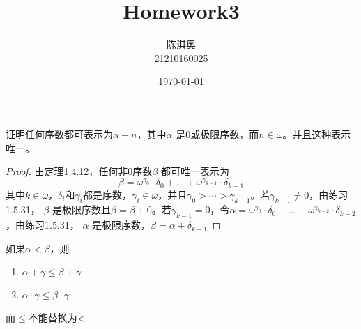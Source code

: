 \documentclass[11pt]{article}
\author{陈淇奥\\21210160025}
\date{\today}
\title{Homework3}
\begin{document}
\maketitle
\begin{exercise}[1.5.26]
证明任何序数都可表示为\(\alpha+n\)，其中\(\alpha\) 是0或极限序数，而\(n\in\omega\)。并且这种表示唯一。
\end{exercise}

\begin{proof}
由定理1.4.12，任何非0序数\(\beta\) 都可唯一表示为
\begin{equation*}
\beta=\omega^{\gamma_0}\cdot\delta_0+\dots+\omega^{\gamma_{k-1}}\cdot\delta_{k-1}
\end{equation*}
其中\(k\in\omega\)，\(\delta_i\)和\(\gamma_i\)都是序数，\(\gamma_i\in\omega\)，并且\(\gamma_0>\cdots>\gamma_{k-1}\)。若\(\gamma_{k-1}\neq 0\)，由练习1.5.31，
\(\beta\) 是极限序数且\(\beta=\beta+0\)。若\(\gamma_{k-1}=0\)，令\(\alpha=\omega^{\gamma_0}\cdot\delta_0+\dots+\omega^{\gamma_{k-2}}\cdot\delta_{k-2}\)，由练习1.5.31，
\(\alpha\) 是极限序数，\(\beta=\alpha+\delta_{k-1}\)
\end{proof}

\begin{exercise}[1.5.30]
如果\(\alpha<\beta\)，则
\begin{enumerate}
\item \(\alpha+\gamma\le\beta+\gamma\)
\item \(\alpha\cdot\gamma\le\beta\cdot\gamma\)
\end{enumerate}


而\(\le\)不能替换为<
\end{exercise}
\end{document}
